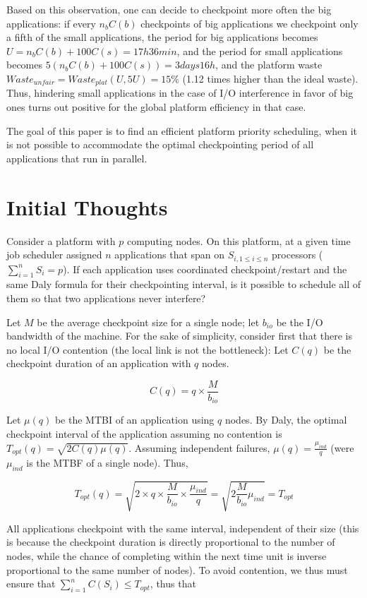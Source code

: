 \documentclass{article}
\begin{document}
Based on this observation, one can decide to checkpoint more often the big applications: if every $n_bC(b)$ checkpoints of big applications we checkpoint only a fifth of the small applications, the period for big applications becomes $U = n_bC(b)+100C(s) = 17h36min$, and the period for small applications becomes $5(n_bC(b)+100C(s)) = 3 days 16h$, and the platform waste $Waste_{unfair} = Waste_{plat}(U, 5U) = 15\%$ (1.12 times higher than the ideal waste). Thus, hindering small applications in the case of I/O interference in favor of big ones turns out positive for the global platform efficiency in that case.

The goal of this paper is to find an efficient platform priority scheduling, when it is not possible to accommodate the optimal checkpointing period of all applications that run in parallel.

\pagebreak

\appendix
\section{Initial Thoughts}

Consider a platform with $p$ computing nodes. On this platform, at a given time job scheduler assigned $n$ applications that span on $S_{i, 1 \leq i \leq n}$ processors ($\sum_{i=1}^{n}S_i = p$). If each application uses coordinated checkpoint/restart and the same Daly formula for their checkpointing interval, is it possible to schedule all of them so that two applications never interfere?

Let $M$ be the average checkpoint size for a single node; let $b_{io}$ be the I/O bandwidth of the machine. For the sake of simplicity, consider first that there is no local I/O contention (the local link is not the bottleneck): Let $C(q)$ be the checkpoint duration of an application with $q$ nodes.

$$C(q) = q\times \frac{M}{b_{io}}$$

Let $\mu(q)$ be the MTBI of an application using $q$ nodes. By Daly, the optimal checkpoint interval of the application assuming no contention is $T_{opt}(q) = \sqrt{2C(q)\mu(q)}$. Assuming independent failures, $\mu(q) = \frac{\mu_{ind}}{q}$ (were $\mu_{ind}$ is the MTBF of a single node). Thus,

$$T_{opt}(q) = \sqrt{2\times q\times \frac{M}{b_{io}} \times \frac{\mu_{ind}}{q}} = \sqrt{2\frac{M}{b_{io}}\mu_{ind}} = T_{opt}$$

All applications checkpoint with the same interval, independent of their size (this is because the checkpoint duration is directly proportional to the number of nodes, while the chance of completing within the next time unit is inverse proportional to the same number of nodes).  To avoid contention, we thus must ensure that $\sum_{i = 1}^{n} C(S_i) \leq T_{opt}$, thus that
\end{document}
